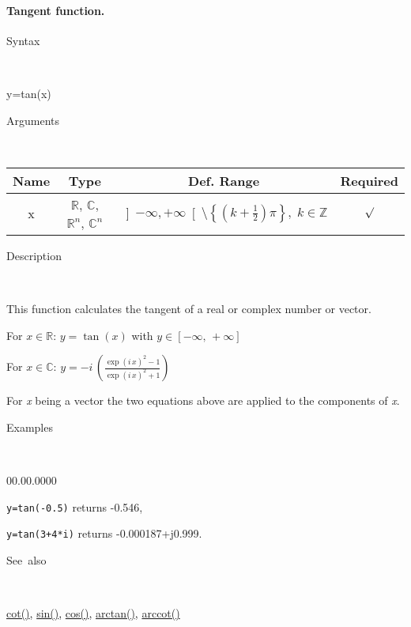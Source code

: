 \paragraph{\label{par:Tangent}Tangent function.}

\begin{description}
\item [Syntax]~
\end{description}
y=tan(x)

\begin{description}
\item [Arguments]~
\end{description}
\begin{tabular}{|c|c|c|c|}
\hline 
Name&
Type&
Def. Range&
Required\tabularnewline
\hline
\hline 
x&
$\mathbb{R}$, $\mathbb{C}$, $\mathbb{R}^{n}$, $\mathbb{C}^{n}$&
$\left]-\infty,+\infty\right[\setminus\left\{ \left(k+\frac{1}{2}\right)\pi\right\} ,\; k\in\mathbb{Z}$&
$\surd$\tabularnewline
\hline
\end{tabular}

\begin{description}
\item [Description]~
\end{description}
This function calculates the tangent of a real or complex number or
vector.

\medskip{}
For $x\in\mathbb{R}$: $y=\tan\left(x\right)$ with $y\in\left[-\infty,\,+\infty\right]$

\medskip{}
For $x\in\mathbb{C}$: $y=-i\,{\displaystyle \left(\frac{\exp\left(i\, x\right)^{2}-1}{\exp\left(i\, x\right)^{2}+1}\right)}$
\medskip{}

For \textit{x} being a vector the two equations above are
applied to the components of \textit{x}.

\begin{description}
\item [Examples]~
\end{description}
\begin{lyxlist}{00.00.0000}
\item [\texttt{y=tan(-0.5)}]returns -0.546,
\item [\texttt{y=tan(3+4{*}i)}]returns -0.000187+j0.999.
\end{lyxlist}
\begin{description}
\item [See~also]~
\end{description}
\textcolor{blue}{\hyperlink{cot}{cot()}}\textcolor{black}{,} \textcolor{blue}{\hyperlink{sin}{sin()}}\textcolor{black}{,}
\textcolor{blue}{\hyperlink{cos}{cos()}}\textcolor{black}{,} \textcolor{blue}{\hyperlink{arctan}{arctan()}}\textcolor{black}{,}
\textcolor{blue}{\hyperlink{arccot}{arccot()}}


